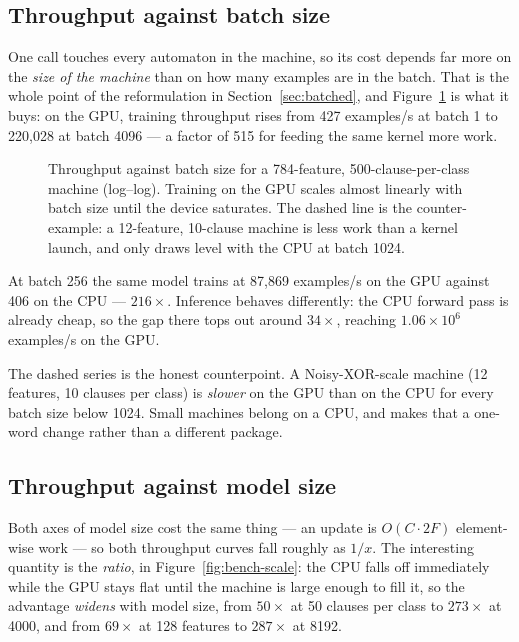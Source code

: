 \subsection{Throughput against batch size}

One  call touches every automaton in the machine, so its cost depends far more
on the \emph{size of the machine} than on how many examples are in the batch. That is the
whole point of the reformulation in Section~\ref{sec:batched}, and
Figure~\ref{fig:bench-batch} is what it buys: on the GPU, training throughput rises from 427
examples/s at batch 1 to 220{,}028 at batch 4096 --- a factor of 515 for feeding the same
kernel more work.

\begin{figure}[htbp]
\centering

\caption{Throughput against batch size for a 784-feature, 500-clause-per-class machine
  (log--log). Training on the GPU scales almost linearly with batch size until the device
  saturates. The dashed line is the counter-example: a 12-feature, 10-clause machine is less
  work than a kernel launch, and only draws level with the CPU at batch 1024.}
\label{fig:bench-batch}
\end{figure}

At batch 256 the same model trains at 87{,}869 examples/s on the GPU against 406 on the CPU
--- $216\times$. Inference behaves differently: the CPU forward pass is already cheap, so the
gap there tops out around $34\times$, reaching $1.06\times10^{6}$ examples/s on the GPU.

The dashed series is the honest counterpoint. A Noisy-XOR-scale machine (12 features, 10
clauses per class) is \emph{slower} on the GPU than on the CPU for every batch size below
1024. Small machines belong on a CPU, and \ttlibname makes that a one-word change rather than
a different package.

\subsection{Throughput against model size}

Both axes of model size cost the same thing --- an update is $O(C \cdot 2F)$ element-wise work
--- so both throughput curves fall roughly as $1/x$. The interesting quantity is the
\emph{ratio}, in Figure~\ref{fig:bench-scale}: the CPU falls off immediately while the GPU
stays flat until the machine is large enough to fill it, so the advantage \emph{widens} with
model size, from $50\times$ at 50 clauses per class to $273\times$ at 4000, and from
$69\times$ at 128 features to $287\times$ at 8192.

